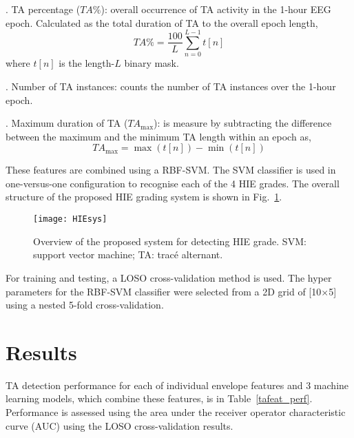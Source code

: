 \documentclass[conference]{IEEEtran}
\begin{document}
\vspace{0.10cm}
. TA percentage ($TA\%$): overall occurrence of TA activity in the 1-hour EEG epoch. Calculated as the total duration of TA to the overall epoch length,
\begin{equation} TA\% = \frac{100}{L} \sum_{n=0}^{L-1}t[n] \end{equation}
where $t[n]$ is the length-$L$ binary mask. %

\vspace{0.10cm}
. Number of TA instances: counts the number of TA instances over the 1-hour epoch. 

\vspace{0.10cm}
. Maximum duration of TA ($TA_{\text{max}}$): is measure by subtracting the difference between the maximum and the minimum TA length within an epoch as,
\begin{equation} TA_{\text{max}} = \max (t[n]) - \min (t[n]) \end{equation}

These features are combined using a RBF-SVM. The SVM classifier is used in one-versus-one configuration to recognise each of the 4 HIE grades. The overall structure of the proposed HIE grading system is shown in Fig.~\ref{hiesystem}.

\begin{figure}[!h]
	\centering
	\texttt{[image: HIEsys]}
	\caption{Overview of the proposed system for detecting HIE grade. SVM: support vector machine; TA: trac\'e alternant.}
	\label{hiesystem}
\end{figure}


For training and testing, a LOSO cross-validation method is used. 
The hyper parameters for the RBF-SVM classifier were selected from a 2D grid of [10$\times$5] using a nested 5-fold cross-validation. 

\section{Results}
\label{expresult}

TA detection performance for each of individual envelope features and 3 machine learning models, which combine these features, is in Table~\ref{tafeat_perf}. Performance is assessed using the area under the receiver operator characteristic curve (AUC) using the LOSO cross-validation results.
\end{document}
